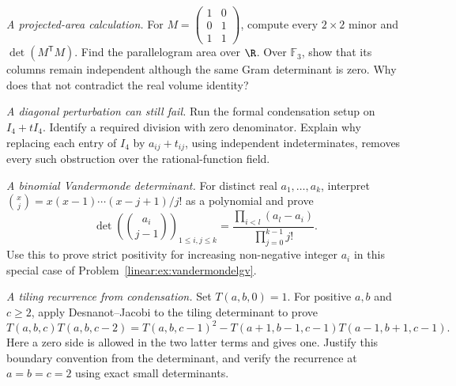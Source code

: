 \begin{exercise}[$\star$]\label{ex:v8cBa}
\emph{A projected-area calculation.} For $M=\begin{pmatrix}1&0\\0&1\\1&1\end{pmatrix}$, compute every $2\times2$ minor and $\det(M^{\mathsf T}M)$. Find the parallelogram area over $\R$. Over $\mathbb F_3$, show that its columns remain independent although the same Gram determinant is zero. Why does that not contradict the real volume identity?
\end{exercise}
\begin{exercise}[$\star\star$]\label{ex:v8cBb}
\emph{A diagonal perturbation can still fail.} Run the formal condensation setup on $I_4+tI_4$. Identify a required division with zero denominator. Explain why replacing each entry of $I_4$ by $a_{ij}+t_{ij}$, using independent indeterminates, removes every such obstruction over the rational-function field.
\end{exercise}
\begin{exercise}[$\star\star$]\label{ex:v8cBc}
\emph{A binomial Vandermonde determinant.} For distinct real $a_1,\ldots,a_k$, interpret $\binom{x}{j}=x(x-1)\cdots(x-j+1)/j!$ as a polynomial and prove
\[\det\left(\binom{a_i}{j-1}\right)_{1\le i,j\le k}
 =\frac{\prod_{i<l}(a_l-a_i)}{\prod_{j=0}^{k-1}j!}.\]
Use this to prove strict positivity for increasing non-negative integer $a_i$ in this special case of Problem~\ref{linear:ex:vandermondelgv}.
\end{exercise}
\begin{exercise}[$\star\star$]\label{ex:v8cBd}
\emph{A tiling recurrence from condensation.} Set $T(a,b,0)=1$. For positive $a,b$ and $c\ge2$, apply Desnanot--Jacobi to the tiling determinant to prove
\[T(a,b,c)T(a,b,c-2)=T(a,b,c-1)^2
 -T(a+1,b-1,c-1)T(a-1,b+1,c-1).\]
Here a zero side is allowed in the two latter terms and gives one. Justify this boundary convention from the determinant, and verify the recurrence at $a=b=c=2$ using exact small determinants.
\end{exercise}

